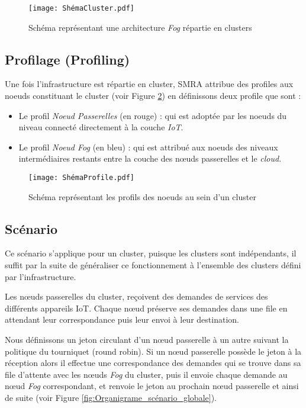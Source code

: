 \begin{figure}[H]
    \centering
    \texttt{[image: ShémaCluster.pdf]}
    \caption{Schéma représentant une architecture \emph{Fog} répartie en clusters}
    \label{fig:Infrastructure_fog_repartie_en_cluster}
\end{figure}


\subsection{Profilage (Profiling)}
Une fois l'infrastructure est répartie en cluster, SMRA attribue des profiles aux noeuds constituant le cluster (voir Figure \ref{fig:profilage}) en définissons deux profile que sont :
\begin{itemize}
  \item Le profil \emph{Noeud Passerelles} (en rouge) : qui est adoptée par les noeuds du niveau connecté directement à la couche \emph{IoT}.
  \item Le profil \emph{Noeud Fog} (en bleu) : qui est attribué aux noeuds des niveaux intermédiaires restants entre la couche des nœuds passerelles et le \emph{cloud}. 
\end{itemize}


\begin{figure}[H]
  \centering
  \texttt{[image: ShémaProfile.pdf]}
  \caption{Schéma représentant les profils des noeuds au sein d'un cluster}
  \label{fig:profilage}
\end{figure}


\subsection{Scénario}
Ce scénario s'applique pour un cluster, puisque les clusters sont indépendants, il suffit par la suite de généraliser ce fonctionnement à l'ensemble des clusters défini par l'infrastructure.\par
Les nœuds passerelles du cluster, reçoivent des demandes de services des différents appareils IoT. Chaque nœud préserve ses demandes dans une file en attendant leur correspondance puis leur envoi à leur destination.\par
Nous définissons un jeton circulant d'un nœud passerelle à un autre suivant la politique du tourniquet (round robin). Si un nœud passerelle possède le jeton à la réception alors il effectue une correspondance des demandes qui se trouve dans sa file d'attente avec les nœuds \emph{Fog} du cluster, puis il envoie chaque demande au nœud \emph{Fog} correspondant, et  renvoie le jeton au prochain nœud passerelle et ainsi de suite (voir Figure \ref{fig:Organigrame_scénario_globale}).


